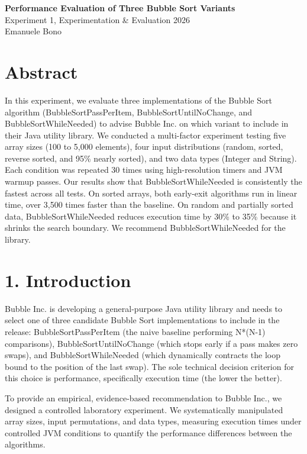 \documentclass[10pt,a4paper]{article}
\begin{document}
{\LARGE \textbf{Performance Evaluation of Three Bubble Sort Variants}}\\[0.25em]
{\large Experiment 1, Experimentation \& Evaluation 2026}\\[0.15em]
{\small Emanuele Bono}

\vspace{0.4em}
\section*{Abstract}
In this experiment, we evaluate three implementations of the Bubble Sort algorithm (BubbleSortPassPerItem, BubbleSortUntilNoChange, and BubbleSortWhileNeeded) to advise Bubble Inc. on which variant to include in their Java utility library. We conducted a multi-factor experiment testing five array sizes (100 to 5,000 elements), four input distributions (random, sorted, reverse sorted, and 95\% nearly sorted), and two data types (Integer and String). Each condition was repeated 30 times using high-resolution timers and JVM warmup passes. Our results show that BubbleSortWhileNeeded is consistently the fastest across all tests. On sorted arrays, both early-exit algorithms run in linear time, over 3,500 times faster than the baseline. On random and partially sorted data, BubbleSortWhileNeeded reduces execution time by 30\% to 35\% because it shrinks the search boundary. We recommend BubbleSortWhileNeeded for the library.

\section*{1. Introduction}
Bubble Inc. is developing a general-purpose Java utility library and needs to select one of three candidate Bubble Sort implementations to include in the release: BubbleSortPassPerItem (the naive baseline performing N*(N-1) comparisons), BubbleSortUntilNoChange (which stops early if a pass makes zero swaps), and BubbleSortWhileNeeded (which dynamically contracts the loop bound to the position of the last swap). The sole technical decision criterion for this choice is performance, specifically execution time (the lower the better).

To provide an empirical, evidence-based recommendation to Bubble Inc., we designed a controlled laboratory experiment. We systematically manipulated array sizes, input permutations, and data types, measuring execution times under controlled JVM conditions to quantify the performance differences between the algorithms.
\end{document}
